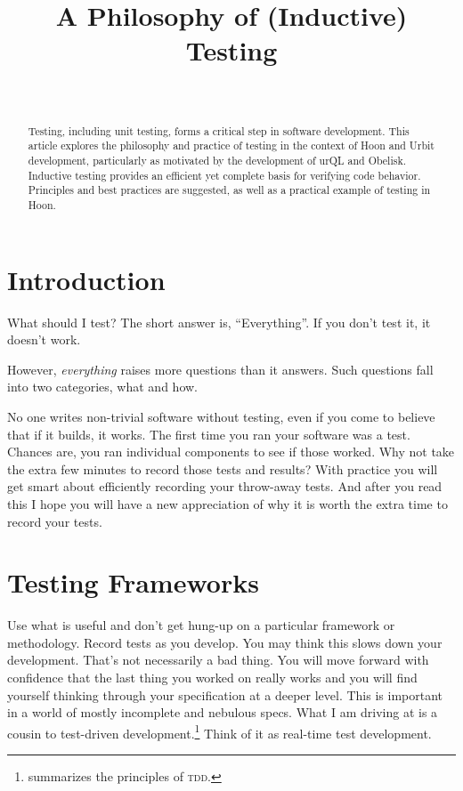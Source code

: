 \documentclass[twoside]{article}
\title{A Philosophy of (Inductive) Testing}
\author{\authorname~\authorpatp \\ \affiliation}
\date{}
\begin{document}
\maketitle
\thispagestyle{firststyle}

\begin{abstract}
  \noindent
  Testing, including unit testing, forms a critical step in software development.  This article explores the philosophy and practice of testing in the context of Hoon and Urbit development, particularly as motivated by the development of urQL and Obelisk.  Inductive testing provides an efficient yet complete basis for verifying code behavior.  Principles and best practices are suggested, as well as a practical example of testing in Hoon.
\end{abstract}

\setcounter{page}{1}

\tableofcontents

\section{Introduction}

What should I test?  The short answer is, “Everything”.  If you don't test it, it doesn't work.

However, \emph{everything} raises more questions than it answers. Such questions fall into two categories, what and how.

No one writes non-trivial software without testing, even if you come to believe that if it builds, it works. The first time you ran your software was a test. Chances are, you ran individual components to see if those worked. Why not take the extra few minutes to record those tests and results? With practice you will get smart about efficiently recording your throw-away tests. And after you read this I hope you will have a new appreciation of why it is worth the extra time to record your tests.

\section{Testing Frameworks}

Use what is useful and don't get hung-up on a particular framework or methodology. Record tests as you develop. You may think this slows down your development. That's not necessarily a bad thing. You will move forward with confidence that the last thing you worked on really works and you will find yourself thinking through your specification at a deeper level. This is important in a world of mostly incomplete and nebulous specs. What I am driving at is a cousin to test-driven development.\footnote{\citet{Beck2023} summarizes the principles of \textsc{tdd}.} Think of it as real-time test development.
\end{document}
